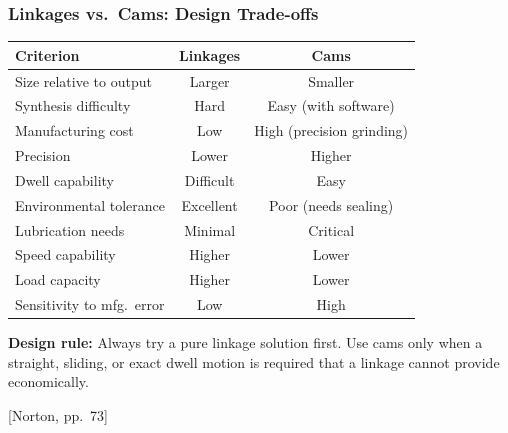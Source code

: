 \documentclass[10pt,aspectratio=43]{beamer}
\newcommand{\pref}[1]{\vfill\hfill{\scriptsize\color{gray}[Norton, pp.~#1]}}
\begin{document}
\begin{frame}
\frametitle{Linkages vs.\ Cams: Design Trade-offs}

\begin{center}
\small
\begin{tabular}{l|c|c}
\toprule
\textbf{Criterion} & \textbf{Linkages} & \textbf{Cams} \\
\midrule
Size relative to output & Larger & Smaller \\
Synthesis difficulty & Hard & Easy (with software) \\
Manufacturing cost & Low & High (precision grinding) \\
Precision & Lower & Higher \\
Dwell capability & Difficult & Easy \\
Environmental tolerance & Excellent & Poor (needs sealing) \\
Lubrication needs & Minimal & Critical \\
Speed capability & Higher & Lower \\
Load capacity & Higher & Lower \\
Sensitivity to mfg.\ error & Low & High \\
\bottomrule
\end{tabular}
\end{center}

\vspace{4pt}
\begin{yellowbox}
\textbf{Design rule:} Always try a pure linkage solution first. Use cams only when a straight, sliding, or exact dwell motion is required that a linkage cannot provide economically.
\end{yellowbox}
\pref{73}
\end{frame}

\end{document}

